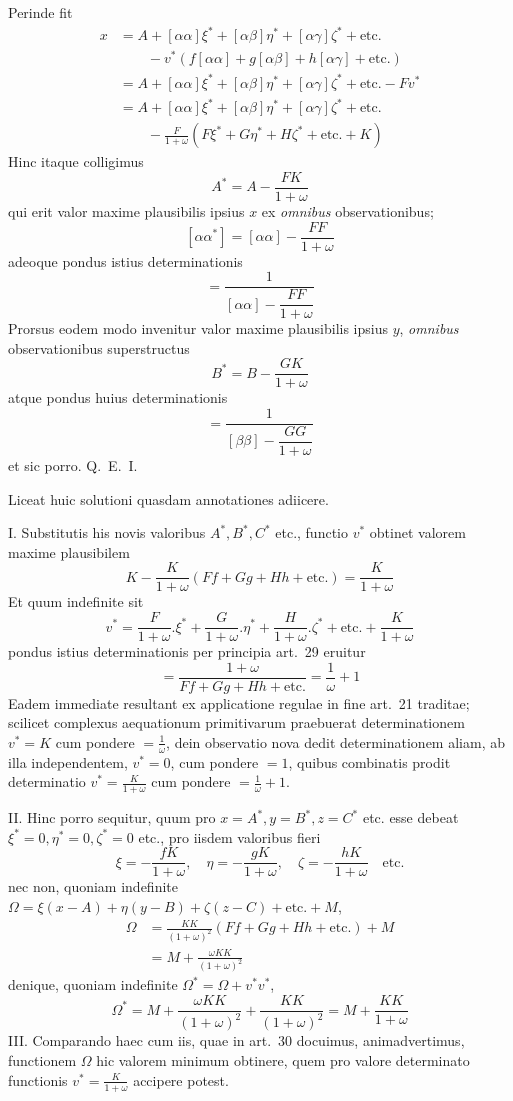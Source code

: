 \noindent Perinde fit
\[
\begin{aligned}
x&=A+[\alpha\alpha]\xi^*+[\alpha\beta]\eta^*+[\alpha\gamma]\zeta^*+\text{etc.}\\
&\qquad-v^*(f[\alpha\alpha]+g[\alpha\beta]+h[\alpha\gamma]+\text{etc.})\\
&=A+[\alpha\alpha]\xi^*+[\alpha\beta]\eta^*+[\alpha\gamma]\zeta^*+\text{etc.}-Fv^*\\
&=A+[\alpha\alpha]\xi^*+[\alpha\beta]\eta^*+[\alpha\gamma]\zeta^*+\text{etc.}\\
&\qquad-\frac{F}{1+\omega}(F\xi^*+G\eta^*+H\zeta^*+\text{etc.}+K)
\end{aligned}
\]
Hinc itaque colligimus
\[
A^*=A-\frac{FK}{1+\omega}
\]
qui erit valor maxime plausibilis ipsius \(x\) ex \textit{omnibus} observationibus;
\[
[\alpha\alpha^*]=[\alpha\alpha]-\frac{FF}{1+\omega}
\]
adeoque pondus istius determinationis
\[
=\frac1{[\alpha\alpha]-\dfrac{FF}{1+\omega}}
\]
Prorsus eodem modo invenitur valor maxime plausibilis ipsius \(y\), \textit{omnibus} observationibus superstructus
\[
B^*=B-\frac{GK}{1+\omega}
\]
atque pondus huius determinationis
\[
=\frac1{[\beta\beta]-\dfrac{GG}{1+\omega}}
\]
et sic porro. Q.\ E.\ I.

Liceat huic solutioni quasdam annotationes adiicere.

I. Substitutis his novis valoribus \(A^*,B^*,C^*\) etc., functio \(v^*\) obtinet valorem maxime plausibilem
\[
K-\frac{K}{1+\omega}(Ff+Gg+Hh+\text{etc.})=\frac{K}{1+\omega}
\]
Et quum indefinite sit
\[
v^*=\frac{F}{1+\omega}.\xi^*+\frac{G}{1+\omega}.\eta^*+\frac{H}{1+\omega}.\zeta^*+\text{etc.}+\frac{K}{1+\omega}
\]
%
pondus istius determinationis per principia art.\ 29 eruitur
\[
=\frac{1+\omega}{Ff+Gg+Hh+\text{etc.}}=\frac1\omega+1
\]
Eadem immediate resultant ex applicatione regulae in fine art.\ 21 traditae; scilicet complexus aequationum primitivarum praebuerat determinationem \(v^*=K\) cum pondere \(=\frac1\omega\), dein observatio nova dedit determinationem aliam, ab illa independentem, \(v^*=0\), cum pondere \(=1\), quibus combinatis prodit determinatio \(v^*=\frac{K}{1+\omega}\) cum pondere \(=\frac1\omega+1\).

II. Hinc porro sequitur, quum pro \(x=A^*,\allowbreak y=B^*,\allowbreak z=C^*\) etc. esse debeat \(\xi^*=0,\allowbreak\eta^*=0,\allowbreak\zeta^*=0\) etc., pro iisdem valoribus fieri
\[
\xi=-\frac{fK}{1+\omega},\quad\eta=-\frac{gK}{1+\omega},\quad\zeta=-\frac{hK}{1+\omega}\quad\text{etc.}
\]
nec non, quoniam indefinite \(\Omega=\xi(x-A)+\eta(y-B)+\zeta(z-C)+\text{etc.}+M\),
\[
\begin{aligned}
\Omega&=\frac{KK}{(1+\omega)^2}(Ff+Gg+Hh+\text{etc.})+M\\
&=M+\frac{\omega KK}{(1+\omega)^2}
\end{aligned}
\]
denique, quoniam indefinite \(\Omega^*=\Omega+v^*v^*\),
\[
\Omega^*=M+\frac{\omega KK}{(1+\omega)^2}+\frac{KK}{(1+\omega)^2}=M+\frac{KK}{1+\omega}
\]
III. Comparando haec cum iis, quae in art.\ 30 docuimus, animadvertimus, functionem \(\Omega\) hic valorem minimum obtinere, quem pro valore determinato functionis \(v^*=\frac{K}{1+\omega}\) accipere potest.

